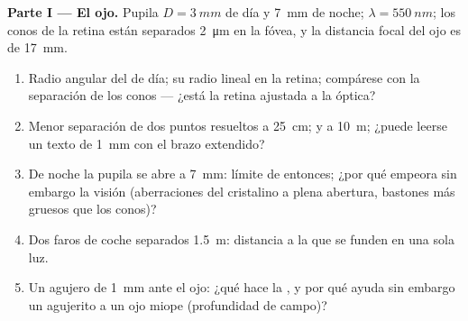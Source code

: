 \begin{problem}
\label{pb:b2:diffraction:1}

\medskip
\noindent\textbf{Parte I --- El ojo.}
Pupila $D = \qty{3}{mm}$ de día y \qty{7}{mm} de noche; $\lambda = \qty{550}{nm}$; los
conos de la retina están separados \qty{2}{\micro m} en la fóvea, y la distancia focal
del ojo es de \qty{17}{mm}.
\begin{enumerate}
  \item Radio angular del  de día; su radio lineal en
        la retina; compárese con la separación de los conos --- ¿está la retina
        ajustada a la óptica?
  \item Menor separación de dos puntos resueltos a \qty{25}{cm}; y a
        \qty{10}{m}; ¿puede leerse un texto de \qty{1}{mm} con el brazo extendido?
  \item De noche la pupila se abre a \qty{7}{mm}: límite de  entonces;
        ¿por qué empeora sin embargo la visión (aberraciones del
        cristalino a plena abertura, bastones más gruesos que los conos)?
  \item Dos faros de coche separados \qty{1.5}{m}: distancia a la que se funden
        en una sola luz.
  \item Un agujero de \qty{1}{mm} ante el ojo: ¿qué hace la ,
        y por qué ayuda sin embargo un agujerito a un ojo miope
        (profundidad de campo)?
\end{enumerate}


\end{problem}

